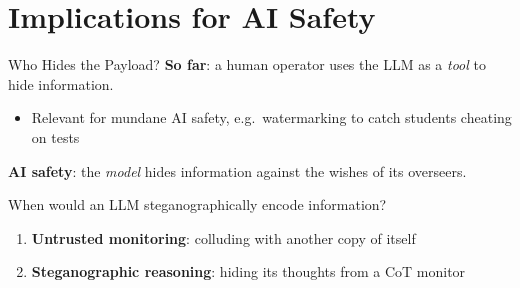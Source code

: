 
\section{Implications for AI Safety}

\begin{frame}{Who Hides the Payload?}
\textbf{So far}: a human operator uses the LLM as a \emph{tool} to hide information.
\begin{itemize}
\item Relevant for mundane AI safety, e.g.\ watermarking to catch students cheating on tests
\end{itemize}
\vspace{0.5em}
\textbf{AI safety}: the \emph{model} hides information against the wishes of its overseers.
\vspace{0.5em}
\begin{center}
\Large When would an LLM steganographically encode information?
\end{center}
\vspace{0.5em}
\begin{enumerate}
\item \textbf{Untrusted monitoring}: colluding with another copy of itself
\item \textbf{Steganographic reasoning}: hiding its thoughts from a CoT monitor
\end{enumerate}

\end{frame}

